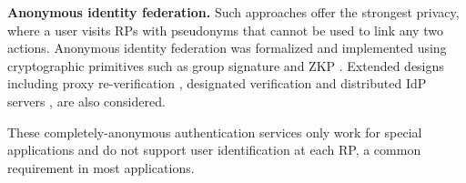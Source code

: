 \noindent\textbf{Anonymous identity federation.}
Such approaches offer the strongest privacy,
    where a user visits RPs with pseudonyms that cannot be used to link any two actions.
Anonymous identity federation was formalized \cite{WangWS13} and implemented using cryptographic primitives such as group signature and ZKP \cite{WangWS13, HanCSTWW20, HanCSTW18}.
Extended designs including proxy re-verification \cite{HanCSTWW20}, designated verification \cite{HanCSTW18} and distributed IdP servers \cite{TSAPP}, are also considered. 

These completely-anonymous authentication services only work for special applications and do not support user identification at each RP, a common requirement in most applications.

